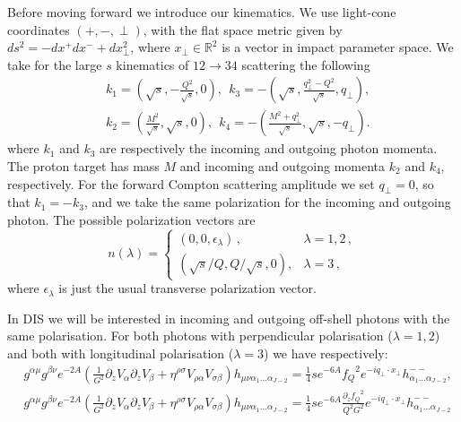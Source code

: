 \documentclass[10 pt]{article}
\begin{document}
Before moving forward we introduce our kinematics. We use light-cone coordinates $\left(+,-,\perp \right)$, with the flat space metric given by $ds^2 = - dx^+ dx^- + d x^2_\perp$, where $x_\perp \in \mathbb{R}^2$ is a vector in impact parameter space. 
We take for the large $s$ kinematics of  $12\to34$ scattering the following
\begin{align}
&k_1=\left(\!\sqrt{s},-\frac{Q^2}{\sqrt{s}} ,0\right),\  \ k_3=-\left(\!\sqrt{s},\frac{ q_\perp^2 -Q^2}{\sqrt{s}} , q_\perp \right)\!,\\
&k_2=\left(\frac{M^2}{\sqrt{s}},\sqrt{s} ,0\right),\  \ k_4=-\left(\frac{M^2+ q_\perp^2}{\sqrt{s}},\sqrt{s} ,-q_\perp \right).
\nonumber
\label{eq:kinematics}
\end{align}
where $k_1$ and $k_3$ are  respectively the incoming  and outgoing photon momenta. The proton 
target has mass $M$ and incoming  and outgoing  momenta $k_2$ and $k_4$, respectively.
For the forward Compton scattering amplitude we set $q_\perp = 0$, so that $k_1=-k_3$, and we take the same polarization
for the  incoming and outgoing photon. The possible polarization vectors are
\begin{equation}
  \label{eq:polarization vectors} 
  n(\lambda)=\begin{cases}
    (0,0,\epsilon_\lambda) \,, & \lambda=1,2 \,,\\
    \left( \sqrt{s}/Q, Q/\sqrt{s},0 \right) , & \lambda=3\,,
    \end{cases}
\end{equation}
where $\epsilon_\lambda$ is just the usual transverse polarization vector.

In DIS we will be interested in incoming and outgoing  off-shell photons with the same polarisation. For both photons with perpendicular polarisation ($\lambda = 1, 2$) and both with longitudinal polarisation ($\lambda = 3$) we have respectively:
\begin{align}
&g^{\alpha \mu} g^{\beta \nu} e^{-2 A} \left( \frac{1}{G^2} \partial_z V_\alpha \partial_z V_\beta + \eta^{\rho \sigma} V_{\rho \alpha} V_{\sigma \beta} \right) h_{\mu \nu \alpha_1 \dots \alpha_{J-2}} = \frac{1}{4} s e^{-6A} {f_Q}^2 e^{-i q_\perp \cdot x_\perp} h^{--}_{\alpha_1 \dots \alpha_{J-2}}, \\
&g^{\alpha \mu} g^{\beta \nu} e^{-2 A} \left( \frac{1}{G^2} \partial_z V_\alpha \partial_z V_\beta + \eta^{\rho \sigma} V_{\rho \alpha} V_{\sigma \beta} \right) h_{\mu \nu \alpha_1 \dots \alpha_{J-2}} = \frac{1}{4} s e^{-6A} \frac{{\partial_z f_Q}^2}{Q^2 G^2} e^{-i q_\perp \cdot x_\perp} h^{--}_{\alpha_1 \dots \alpha_{J-2}}
\end{align}
\end{document}
